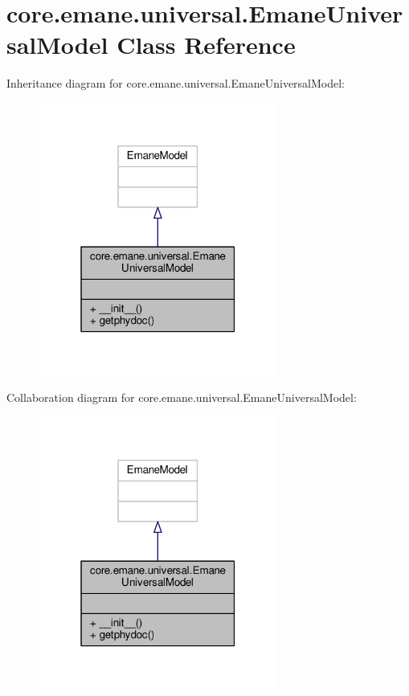 \hypertarget{classcore_1_1emane_1_1universal_1_1_emane_universal_model}{\section{core.\+emane.\+universal.\+Emane\+Universal\+Model Class Reference}
\label{classcore_1_1emane_1_1universal_1_1_emane_universal_model}
}


Inheritance diagram for core.\+emane.\+universal.\+Emane\+Universal\+Model\+:
\nopagebreak
\begin{figure}[H]
\begin{center}
\leavevmode
\includegraphics[width=223pt]{classcore_1_1emane_1_1universal_1_1_emane_universal_model__inherit__graph}
\end{center}
\end{figure}


Collaboration diagram for core.\+emane.\+universal.\+Emane\+Universal\+Model\+:
\nopagebreak
\begin{figure}[H]
\begin{center}
\leavevmode
\includegraphics[width=223pt]{classcore_1_1emane_1_1universal_1_1_emane_universal_model__coll__graph}
\end{center}
\end{figure}
